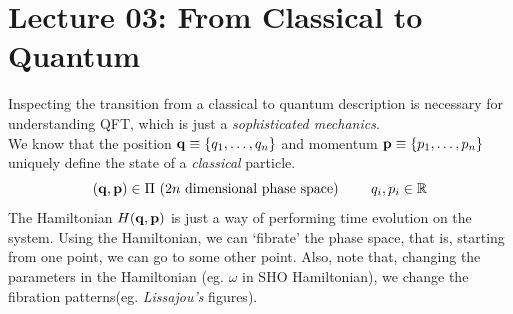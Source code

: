\section*{Lecture 03: From Classical to Quantum}
Inspecting the transition from a classical to quantum description is necessary for understanding QFT, which is just a \textit{sophisticated mechanics}. \\[0.2cm]
We know that the position $\vb{q}\equiv \{q_1,\ldots, q_n\}$ and momentum $\vb{p}\equiv \{p_1,\ldots,p_n\}$ uniquely define the state of a \textit{classical} particle. $$(\vb{q},\vb{p})\in \Pi \ \text{($2n$ dimensional phase space) }\qquad q_i,p_i\in \mathbb{R}$$
The Hamiltonian $H(\vb{q}, \vb{p})$ is just a way of performing time evolution on the system. Using the Hamiltonian, we can `fibrate' the phase space, that is, starting from one point, we can go to some other point. Also, note that, changing the parameters in the Hamiltonian (eg. $\omega$ in SHO Hamiltonian), we change the fibration patterns(eg. \textit{Lissajou's} figures). 



